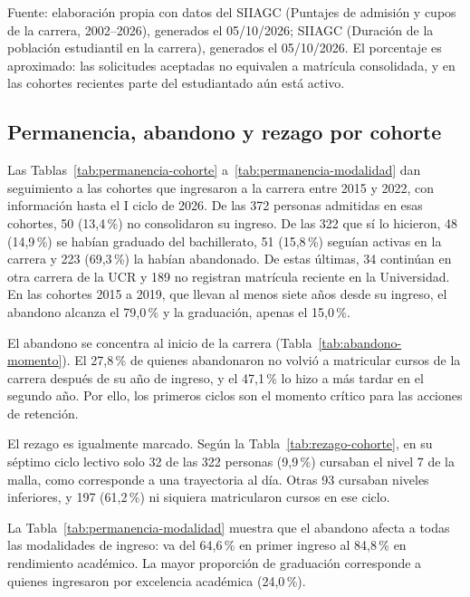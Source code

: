 %
\vspace{-0.8\baselineskip}
{\footnotesize Fuente: elaboración propia con datos del SIIAGC (Puntajes de admisión y cupos de la carrera, 2002--2026), generados el 05/10/2026; SIIAGC (Duración de la población estudiantil en la carrera), generados el 05/10/2026. El porcentaje es aproximado: las solicitudes aceptadas no equivalen a matrícula consolidada, y en las cohortes recientes parte del estudiantado aún está activo.\par}
\endgroup
\medskip

\subsection{Permanencia, abandono y rezago por cohorte}

Las Tablas~\ref{tab:permanencia-cohorte} a~\ref{tab:permanencia-modalidad} dan seguimiento a las cohortes que ingresaron a la carrera entre 2015 y 2022, con información hasta el I ciclo de 2026. De las 372 personas admitidas en esas cohortes, 50 (13,4\,\%) no consolidaron su ingreso. De las 322 que sí lo hicieron, 48 (14,9\,\%) se habían graduado del bachillerato, 51 (15,8\,\%) seguían activas en la carrera y 223 (69,3\,\%) la habían abandonado. De estas últimas, 34 continúan en otra carrera de la UCR y 189 no registran matrícula reciente en la Universidad. En las cohortes 2015 a 2019, que llevan al menos siete años desde su ingreso, el abandono alcanza el 79,0\,\% y la graduación, apenas el 15,0\,\%.

El abandono se concentra al inicio de la carrera (Tabla~\ref{tab:abandono-momento}). El 27,8\,\% de quienes abandonaron no volvió a matricular cursos de la carrera después de su año de ingreso, y el 47,1\,\% lo hizo a más tardar en el segundo año. Por ello, los primeros ciclos son el momento crítico para las acciones de retención.

El rezago es igualmente marcado. Según la Tabla~\ref{tab:rezago-cohorte}, en su séptimo ciclo lectivo solo 32 de las 322 personas (9,9\,\%) cursaban el nivel 7 de la malla, como corresponde a una trayectoria al día. Otras 93 cursaban niveles inferiores, y 197 (61,2\,\%) ni siquiera matricularon cursos en ese ciclo.

La Tabla~\ref{tab:permanencia-modalidad} muestra que el abandono afecta a todas las modalidades de ingreso: va del 64,6\,\% en primer ingreso al 84,8\,\% en rendimiento académico. La mayor proporción de graduación corresponde a quienes ingresaron por excelencia académica (24,0\,\%).

